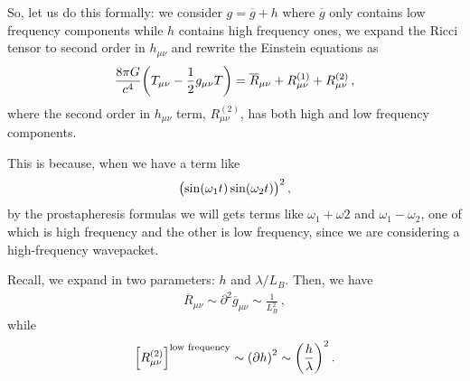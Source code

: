 \documentclass[main.tex]{subfiles}
\begin{document}




So, let us do this formally: we consider \(g = \overline{g} + h\) where \(\overline{g}\) only contains low frequency components while \(h\) contains high frequency ones, we expand the Ricci tensor to second order in \(h_{\mu \nu }\) and rewrite the Einstein equations as
%
\begin{align}
\frac{8 \pi G}{c^{4}} \qty(T_{\mu \nu } - \frac{1}{2} g_{\mu \nu }T)
= \overline{R}_{\mu \nu } 
+ R^{(1)}_{\mu \nu } 
+ R^{(2)}_{\mu \nu } 
\,,
\end{align}
%
where the second order in \(h_{\mu \nu }\) term, \(R^{(2)}_{\mu \nu }\), has both high and low frequency components. 

This is because, when we have a term like 
%
\begin{align}
\qty(\sin(\omega_{1} t)\sin(\omega_2 t))^2
\,,
\end{align}
%
by the prostapheresis formulas we will gets terms like \(\omega_1 + \omega 2 \) and \(\omega_1 - \omega_2 \), one of which is high frequency and the other is low frequency, since we are considering a high-frequency wavepacket.

Recall, we expand in two parameters: \(h\) and \(\lambda / L_B\). Then, we have 
%
\begin{align}
\overline{R}_{\mu \nu } \sim \partial^2 \overline{g}_{\mu \nu } \sim \frac{1}{L_B^2} 
\,,
\end{align}
%
while 
%
\begin{align}
\qty[R^{(2)}_{\mu \nu }]^{\text{low frequency}} \sim \qty(\partial h)^2
 \sim \qty(\frac{h}{\lambda })^2
\,.
\end{align}
\end{document}
